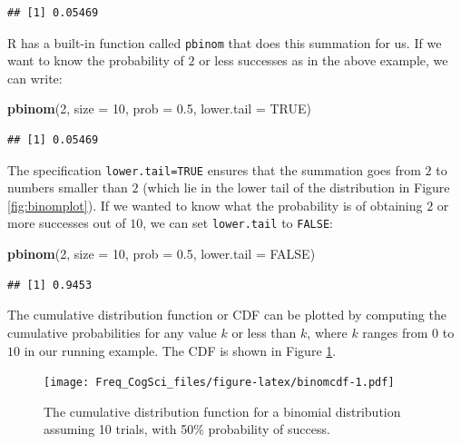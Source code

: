 \documentclass[12pt,]{krantz}
\newenvironment{Shaded}{\begin{snugshade}}{\end{snugshade}}
\newcommand{\DataTypeTok}[1]{\textcolor[rgb]{0.13,0.29,0.53}{#1}}
\newcommand{\DecValTok}[1]{\textcolor[rgb]{0.00,0.00,0.81}{#1}}
\newcommand{\FloatTok}[1]{\textcolor[rgb]{0.00,0.00,0.81}{#1}}
\newcommand{\KeywordTok}[1]{\textcolor[rgb]{0.13,0.29,0.53}{\textbf{#1}}}
\newcommand{\NormalTok}[1]{#1}
\newcommand{\OtherTok}[1]{\textcolor[rgb]{0.56,0.35,0.01}{#1}}
\begin{document}
\begin{verbatim}
## [1] 0.05469
\end{verbatim}

R has a built-in function called \texttt{pbinom} that does this summation for us. If we want to know the probability of \(2\) or less successes as in the above example, we can write:

\begin{Shaded}
\begin{Highlighting}[]
\KeywordTok{pbinom}\NormalTok{(}\DecValTok{2}\NormalTok{, }\DataTypeTok{size =} \DecValTok{10}\NormalTok{, }\DataTypeTok{prob =} \FloatTok{0.5}\NormalTok{, }\DataTypeTok{lower.tail =} \OtherTok{TRUE}\NormalTok{)}
\end{Highlighting}
\end{Shaded}

\begin{verbatim}
## [1] 0.05469
\end{verbatim}

The specification \texttt{lower.tail=TRUE} ensures that the summation goes from \(2\) to numbers smaller than \(2\) (which lie in the lower tail of the distribution in Figure \ref{fig:binomplot}). If we wanted to know what the probability is of obtaining \(2\) or more successes out of \(10\), we can set \texttt{lower.tail} to \texttt{FALSE}:

\begin{Shaded}
\begin{Highlighting}[]
\KeywordTok{pbinom}\NormalTok{(}\DecValTok{2}\NormalTok{, }\DataTypeTok{size =} \DecValTok{10}\NormalTok{, }\DataTypeTok{prob =} \FloatTok{0.5}\NormalTok{, }\DataTypeTok{lower.tail =} \OtherTok{FALSE}\NormalTok{)}
\end{Highlighting}
\end{Shaded}

\begin{verbatim}
## [1] 0.9453
\end{verbatim}

The cumulative distribution function or CDF can be plotted by computing the cumulative probabilities for any value \(k\) or less than \(k\), where \(k\) ranges from \(0\) to \(10\) in our running example. The CDF is shown in Figure \ref{fig:binomcdf}.

\begin{figure}
\centering
\texttt{[image: Freq\_CogSci\_files/figure-latex/binomcdf-1.pdf]}
\caption{\label{fig:binomcdf}The cumulative distribution function for a binomial distribution assuming 10 trials, with 50\% probability of success.}
\end{figure}
\end{document}
